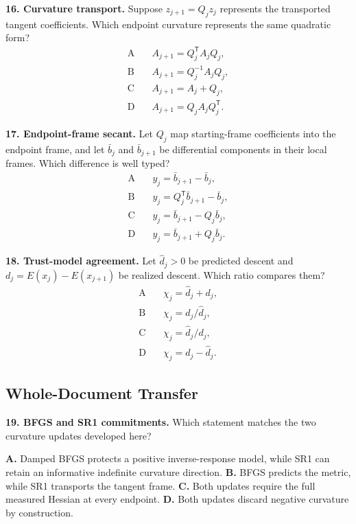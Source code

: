 \documentclass[10pt,twocolumn]{article}
\begin{document}
\textbf{16. Curvature transport.}
Suppose \(z_{j+1}=Q_jz_j\) represents the transported tangent coefficients.
Which endpoint curvature represents the same quadratic form?
\[
\begin{aligned}
\mathrm{A}\quad&A_{j+1}=Q_j^{\mathsf T}A_jQ_j,\\
\mathrm{B}\quad&A_{j+1}=Q_j^{-1}A_jQ_j,\\
\mathrm{C}\quad&A_{j+1}=A_j+Q_j,\\
\mathrm{D}\quad&A_{j+1}=Q_jA_jQ_j^{\mathsf T}.
\end{aligned}
\]

\textbf{17. Endpoint-frame secant.}
Let \(Q_j\) map starting-frame coefficients into the endpoint frame, and let
\(\bar b_j\) and \(\bar b_{j+1}\) be differential components in their local
frames. Which difference is well typed?
\[
\begin{aligned}
\mathrm{A}\quad&y_j=\bar b_{j+1}-\bar b_j,\\
\mathrm{B}\quad&y_j=Q_j^{\mathsf T}\bar b_{j+1}-\bar b_j,\\
\mathrm{C}\quad&y_j=\bar b_{j+1}-Q_j\bar b_j,\\
\mathrm{D}\quad&y_j=\bar b_{j+1}+Q_j\bar b_j.
\end{aligned}
\]

\textbf{18. Trust-model agreement.}
Let \(\widehat d_j>0\) be predicted descent and
\(d_j=E(x_j)-E(x_{j+1})\) be realized descent. Which ratio compares them?
\[
\begin{aligned}
\mathrm{A}\quad&\chi_j=\widehat d_j+d_j,\\
\mathrm{B}\quad&\chi_j=d_j/\widehat d_j,\\
\mathrm{C}\quad&\chi_j=\widehat d_j/d_j,\\
\mathrm{D}\quad&\chi_j=d_j-\widehat d_j.
\end{aligned}
\]

\subsection*{Whole-Document Transfer}

\textbf{19. BFGS and SR1 commitments.}
Which statement matches the two curvature updates developed here?

\textbf{A.} Damped BFGS protects a positive inverse-response model, while SR1
can retain an informative indefinite curvature direction.\quad
\textbf{B.} BFGS predicts the metric, while SR1 transports the tangent frame.\quad
\textbf{C.} Both updates require the full measured Hessian at every endpoint.\quad
\textbf{D.} Both updates discard negative curvature by construction.
\end{document}
